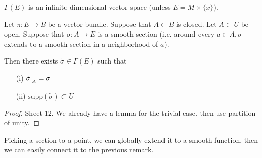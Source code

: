 \begin{remark}
    \(\Gamma(E)\) is an infinite dimensional vector space (unless \(E=M\times \{x\}\)).
\end{remark}

\begin{lemma}\label{lem:8.6}
    Let \(\pi:E\to B\) be a vector bundle. Suppose that \(A\subset B\) is closed. Let \(A\subset U\) be open.
    Suppose that \(\sigma:A\to E\) is a smooth section (i.e. around every \(a\in A,\sigma\) extends to a smooth section in a neighborhood of \(a\)).
    
    Then there exists \(\tilde{\sigma}\in \Gamma(E)\) such that 
    \begin{enumerate}
        \item[(i)] \(\tilde{\sigma}_{|_{A}}=\sigma\)
        \item[(ii)] \(\text{supp}(\tilde{\sigma})\subset U\)  
    \end{enumerate}
\end{lemma}

\begin{proof}
    Sheet 12. We already have a lemma for the trivial case, then use partition of unity.
\end{proof}

Picking a section to a point, we can globally extend it to a smooth function, then we can easily connect it 
to the previous remark.


